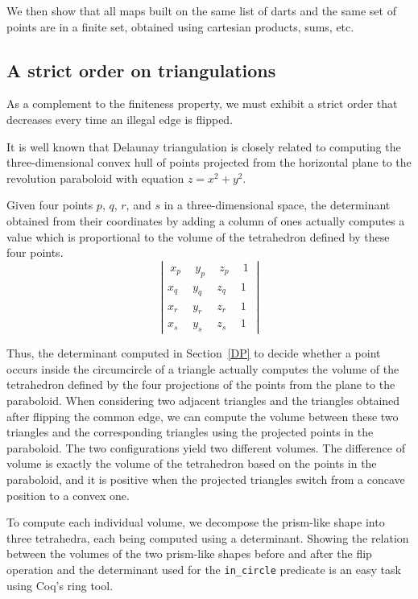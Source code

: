 \documentclass{llncs}
\begin{document}
We then show that all maps built on the same list of darts and the same
set of points are in a finite set, obtained using cartesian products, sums,
etc.
\subsection{A strict order on triangulations}

As a complement to the finiteness property, we must exhibit a strict order
that decreases every time an illegal edge is flipped.

It is well known that Delaunay triangulation is closely related to
computing the three-dimensional convex hull of points projected from
the horizontal plane to the revolution paraboloid with equation \(z =
x^2 + y^2\).

Given four points \(p\), \(q\), \(r\), and \(s\) in a
three-dimensional space, the determinant obtained from their
coordinates by adding a column of ones actually computes a value which
is proportional to the volume of the tetrahedron defined by these four
points.
\[\left|\begin{array}{cccc}~x_p~&~y_p~&~z_p~& ~1~\\
  x_q&y_q&z_q& 1\\
  x_r&y_r&z_r& 1\\
  x_s&y_s&z_s& 1\end{array}\right|\] 

Thus, the determinant computed in Section~\ref{DP} to decide whether a
point occurs inside the circumcircle of a triangle actually computes
the volume of the tetrahedron defined by the four projections of the
points from the plane to the paraboloid. When considering two adjacent
triangles and the triangles obtained after flipping the common edge,
we can compute the volume between these two triangles
and the corresponding triangles using the projected points in the
paraboloid. The two configurations yield two different volumes.
The difference of volume is exactly the volume of the
tetrahedron based on the points in the paraboloid, and it is positive
when the projected triangles switch from a concave position to a
convex one.

To compute each individual volume, we decompose the prism-like shape
into three tetrahedra, each being computed using a
determinant. Showing the relation between the volumes of the two
prism-like shapes before and after the flip operation and the
determinant used for the {\tt in\_circle} predicate is an easy task
using Coq's ring tool.
\end{document}
